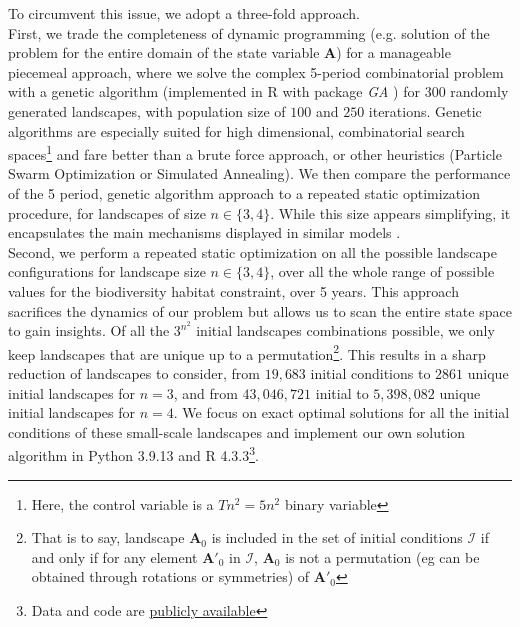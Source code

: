 To circumvent this issue, we adopt a three-fold approach. \\
First, we trade the completeness of dynamic programming (e.g. solution of the problem for the entire domain of the state variable $\mathbf{A}$) for a manageable piecemeal approach, where we solve the complex 5-period combinatorial problem with a genetic algorithm \citep{holland_adaptation_1975} (implemented in \textsf{R} with package \textit{GA} \citep{GA_2017}) for 300 randomly generated landscapes, with population size of $100$ and $250$ iterations. Genetic algorithms are especially suited for high dimensional, combinatorial search spaces\footnote{Here, the control variable is a $Tn^2 = 5n^2$ binary variable} and fare better than a brute force approach, or other heuristics (Particle Swarm Optimization or Simulated Annealing). We then compare the performance of the 5 period, genetic algorithm approach to a repeated static optimization procedure, for landscapes of size $n\in\{3,4\}$. While this size appears simplifying, it encapsulates the main mechanisms displayed in similar models \citep{rachmawati_optimisation_2016, rachmawati_fuel_2018}.
\\
Second, we perform a repeated static optimization on all the possible landscape configurations for landscape size $n \in \{3, 4\}$, over all the whole range of possible values for the biodiversity habitat constraint, over 5 years. This approach sacrifices the dynamics of our problem but allows us to scan the entire state space to gain insights.
Of all the $3^{n^2}$ initial landscapes combinations possible, we only keep landscapes that are unique up to a permutation\footnote{That is to say, landscape $\mathbf{A}_0$ is included in the set of initial conditions $\mathcal{I}$ if and only if for any element $\mathbf{A'}_0$ in $\mathcal{I}$, $\mathbf{A}_0$ is not a permutation (eg can be obtained through rotations or symmetries) of $\mathbf{A'}_0$}. This results in a sharp reduction of landscapes to consider, from $19,683$ initial conditions to $2861$ unique initial landscapes for $n=3$, and from $43,046,721$ initial to $5,398,082$ unique initial landscapes for $n=4$. We focus on exact optimal solutions for all the initial conditions of these small-scale landscapes and implement our own solution algorithm in Python 3.9.13 and R 4.3.3\footnote{Data and code are \href{https://github.com/sim-jean/Landscape_connectivity_dilemma}{publicly available}}.
\\
